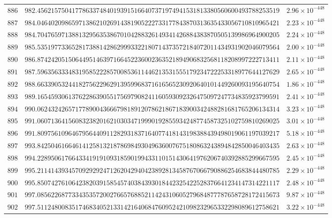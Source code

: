 \documentclass[12pt,reqno]{amsart}
\theoremstyle{remark}
\begin{document}
\begin{longtable}{clc}
$886$ & $982.4562157504177863374840193915166407371974941531813380560600493788253519$ & $2.96\times 10^{-448}$ \\
$887$ & $984.0464020986597138621026914381905222733177843870313635433056710810965421$ & $2.23\times 10^{-448}$ \\
$888$ & $984.7047659713881329563538670104288326149341426884383870505139986964900205$ & $2.24\times 10^{-448}$ \\
$889$ & $985.5351977336528173881428629993322180714373572184072011434931902046079564$ & $2.00\times 10^{-448}$ \\
$890$ & $986.8742420515064495146397166452236002363521894906832568118208997222713411$ & $2.11\times 10^{-448}$ \\
$891$ & $987.5963563334831958522285700853611446213531555179234722253318977644127629$ & $2.65\times 10^{-448}$ \\
$892$ & $988.6633905324418275622962913959968371616565230920640101449260093195640754$ & $1.86\times 10^{-448}$ \\
$893$ & $989.1654593061376228639055175697908241160593092326475097247734835923799591$ & $2.41\times 10^{-448}$ \\
$894$ & $990.0624324265717789004366679818912078621867183900342488281681765206134314$ & $3.23\times 10^{-448}$ \\
$895$ & $991.0607136415608323820162103034719990192855934248774587325102759810269025$ & $3.01\times 10^{-448}$ \\
$896$ & $991.8097561096467956440911282931837164077418143198388439498019061197039217$ & $5.18\times 10^{-448}$ \\
$897$ & $993.8425046166461412581321878698493049636007675180863243894842850046403435$ & $2.63\times 10^{-448}$ \\
$898$ & $994.2289506176643341919109318590199433110151430641976206740392885299667595$ & $2.45\times 10^{-448}$ \\
$899$ & $995.2114143934570929292471262042940423892813458767066790886254683844480785$ & $2.29\times 10^{-448}$ \\
$900$ & $995.8507427610642382039158545740384393018442325422528376641234147314221117$ & $2.48\times 10^{-448}$ \\
$901$ & $997.0856226877334353572002766576885211424310605279684877787658728172415673$ & $9.87\times 10^{-448}$ \\
$902$ & $997.5112480083517468340521331421640684760952421098232965332298089612758621$ & $3.22\times 10^{-448}$ \\

\end{longtable}
\end{document}
